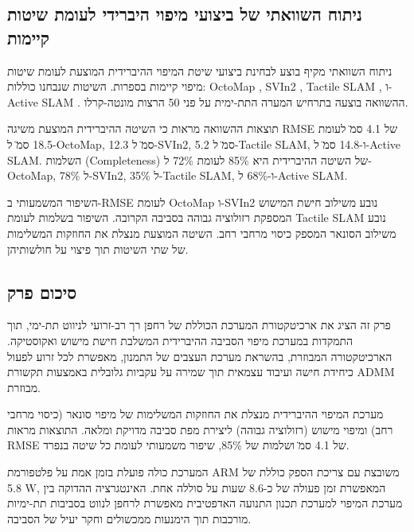 \subsection{ניתוח השוואתי של ביצועי מיפוי היברידי לעומת שיטות קיימות}
\label{sec:ch07_comparative_mapping}

ניתוח השוואתי מקיף בוצע לבחינת ביצועי שיטת המיפוי ההיברידית המוצעת לעומת שיטות מיפוי קיימות בספרות. השיטות שנבחנו כוללות: OctoMap \cite{Hornung2013}, SVIn2 \cite{Rahman2019}, Tactile SLAM \cite{Luo2022}, ו-Active SLAM \cite{Fox2006}. ההשוואה בוצעה בתרחיש המערה התת-ימית על פני 50 הרצות מונטה-קרלו.

תוצאות ההשוואה מראות כי השיטה ההיברידית המוצעת משיגה RMSE של 4.1 ס\"מ לעומת 18.5 ס\"מ ל-OctoMap, 12.3 ס\"מ ל-SVIn2, 5.2 ס\"מ ל-Tactile SLAM, ו-14.8 ס\"מ ל-Active SLAM. השלמות (Completeness) של השיטה ההיברידית היא 85\% לעומת 72\% ל-OctoMap, 78\% ל-SVIn2, 35\% ל-Tactile SLAM, ו-68\% ל-Active SLAM.

השיפור המשמעותי ב-RMSE לעומת OctoMap ו-SVIn2 נובע משילוב חישת המישוש המספקת רזולוציה גבוהה בסביבה הקרובה. השיפור בשלמות לעומת Tactile SLAM נובע משילוב הסונאר המספק כיסוי מרחבי רחב. השיטה המוצעת מנצלת את החוזקות המשלימות של שתי השיטות תוך פיצוי על חולשותיהן.

\subsection{סיכום פרק}
\label{sec:ch07_summary}

פרק זה הציג את ארכיטקטורת המערכת הכוללת של רחפן רך רב-זרועי לניווט תת-ימי, תוך התמקדות במערכת מיפוי הסביבה ההיברידית המשלבת חישת מישוש ואקוסטיקה. הארכיטקטורה המבוזרת, בהשראת מערכת העצבים של התמנון, מאפשרת לכל זרוע לפעול כיחידת חישה ועיבוד עצמאית תוך שמירה על עקביות גלובלית באמצעות תקשורת ADMM מבוזרת.

מערכת המיפוי ההיברידית מנצלת את החוזקות המשלימות של מיפוי סונאר (כיסוי מרחבי רחב) ומיפוי מישוש (רזולוציה גבוהה) ליצירת מפת סביבה מדויקת ומלאה. התוצאות מראות RMSE של 4.1 ס\"מ ושלמות של 85\%, שיפור משמעותי לעומת כל שיטה בנפרד.

המערכת כולה פועלת בזמן אמת על פלטפורמת ARM משובצת עם צריכת הספק כוללת של 5.8 W, המאפשרת זמן פעולה של כ-8.6 שעות על סוללה אחת. האינטגרציה ההדוקה בין מערכת המיפוי למערכת תכנון התנועה האדפטיבית מאפשרת לרחפן לנווט בסביבות תת-ימיות מורכבות תוך הימנעות ממכשולים וחקר יעיל של הסביבה.

\cite{Thrun2005, Hornung2013, Luo2022, Fox2006, Rahman2019, Cadena2016, Dellaert2017, Boyd2011}

